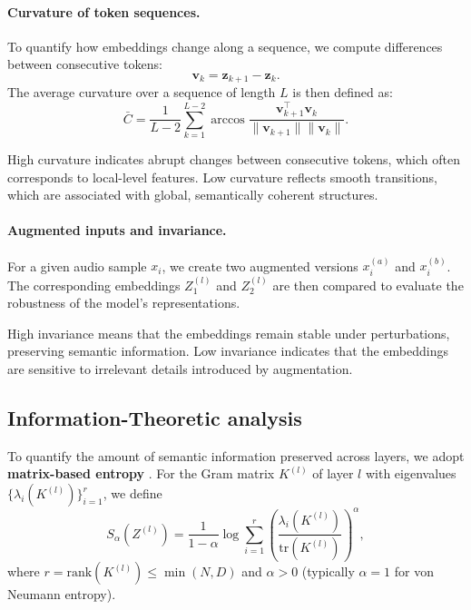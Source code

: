 \documentclass{Interspeech}
\begin{document}
\paragraph{Curvature of token sequences.} To quantify how embeddings change along a sequence, we compute differences between consecutive tokens: 
\[
\mathbf{v}_k = \mathbf{z}_{k+1} - \mathbf{z}_k.
\] 
The average curvature over a sequence of length $L$ is then defined as:
\[
\bar{C} = \frac{1}{L-2} \sum_{k=1}^{L-2} 
\arccos \frac{\mathbf{v}_{k+1}^\top \mathbf{v}_k}{\|\mathbf{v}_{k+1}\|\|\mathbf{v}_k\|}.
\]

\begin{tcolorbox}[colback=gray!10,colframe=black!50,title=Intuition]
High curvature indicates abrupt changes between consecutive tokens, which often corresponds to local-level features.  
Low curvature reflects smooth transitions, which are associated with global, semantically coherent structures.
\end{tcolorbox}

\paragraph{Augmented inputs and invariance.} For a given audio sample $x_i$, we create two augmented versions $x_i^{(a)}$ and $x_i^{(b)}$. 
The corresponding embeddings $Z_1^{(l)}$ and $Z_2^{(l)}$ are then compared to evaluate the robustness of the model's representations.

\begin{tcolorbox}[colback=gray!10,colframe=black!50,title=Intuition]
High invariance means that the embeddings remain stable under perturbations, preserving semantic information.  
Low invariance indicates that the embeddings are sensitive to irrelevant details introduced by augmentation.
\end{tcolorbox}

\subsection{Information-Theoretic analysis}
To quantify the amount of semantic information preserved across layers, we adopt \textbf{matrix-based entropy} \cite{yu2019multivariate,skean2023dime}. 
For the Gram matrix $K^{(l)}$ of layer $l$ with eigenvalues $\{\lambda_i(K^{(l)})\}_{i=1}^{r}$, we define
\[
S_\alpha(Z^{(l)}) = \frac{1}{1-\alpha} 
\log \sum_{i=1}^{r} \left( \frac{\lambda_i(K^{(l)})}{\mathrm{tr}(K^{(l)})} \right)^\alpha,
\]
where $r = \mathrm{rank}(K^{(l)}) \le \min(N,D)$ and $\alpha>0$ (typically $\alpha = 1$ for von Neumann entropy).
\end{document}
